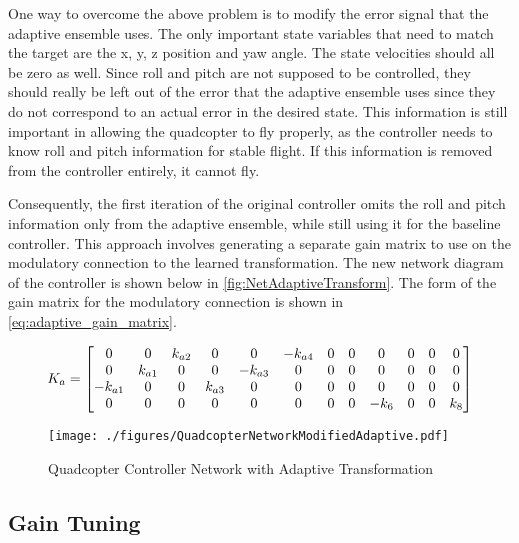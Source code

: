\documentclass[letterpaper,12pt,titlepage,oneside,final]{book}
\begin{document}
One way to overcome the above problem is to modify the error signal that the adaptive ensemble uses. 
The only important state variables that need to match the target are the x, y, z position and yaw angle. 
The state velocities should all be zero as well. 
Since roll and pitch are not supposed to be controlled, they should really be left out of the error that the adaptive ensemble uses since they do not correspond to an actual error in the desired state. 
This information is still important in allowing the quadcopter to fly properly, as the controller needs to know roll and pitch information for stable flight. If this information is removed from the controller entirely, it cannot fly.

Consequently, the first iteration of the original controller omits the roll and pitch information only from the adaptive ensemble, while still using it for the baseline controller. 
This approach involves generating a separate gain matrix to use on the modulatory connection to the learned transformation. 
The new network diagram of the controller is shown below in \autoref{fig:NetAdaptiveTransform}. 
The form of the gain matrix for the modulatory connection is shown in \eqref{eq:adaptive_gain_matrix}.

\begin{equation} \label{eq:adaptive_gain_matrix}
K_{a} =
\setcounter{MaxMatrixCols}{12}
\begin{bmatrix}
0 & 0 & k_{a2} & 0 & 0 & -k_{a4} & 0 & 0 & 0 & 0 & 0 & 0 \\
0 & k_{a1} & 0 & 0 & -k_{a3} & 0 & 0 & 0 & 0 & 0 & 0 & 0 \\
-k_{a1} & 0 & 0 & k_{a3} & 0 & 0 & 0 & 0 & 0 & 0 & 0 & 0 \\
0 & 0 & 0 & 0 & 0 & 0 & 0 & 0 & -k_{6} & 0 & 0 & k_{8}
\end{bmatrix}
\end{equation}

\begin{figure}
\centering
\texttt{[image: ./figures/QuadcopterNetworkModifiedAdaptive.pdf]} %
\caption{Quadcopter Controller Network with Adaptive Transformation}
\label{fig:NetAdaptiveTransform}
\end{figure}


\subsection{Gain Tuning}
\end{document}
